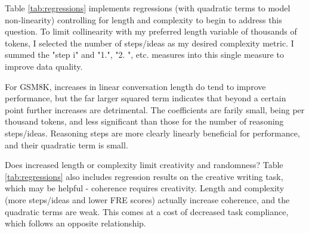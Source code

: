 \documentclass[11pt]{article}
\begin{document}
Table \ref{tab:regressions} implements regressions (with quadratic terms to model non-linearity) controlling for length and complexity to begin to address this question. To limit collinearity with my preferred length variable of thousands of tokens, I selected the number of steps/ideas as my desired complexity metric. I summed the "step i" and "1.", "2. ", etc. measures into this single measure to improve data quality.

For GSM8K, increases in linear conversation length do tend to improve performance, but the far larger squared term indicates that beyond a certain point further increases are detrimental. The coefficients are farily small, being per thousand tokens, and less significant than those for the number of reasoning steps/ideas. Reasoning steps are more clearly linearly beneficial for performance, and their quadratic term is small.

Does increased length or complexity limit creativity and randomness? Table \ref{tab:regressions} also includes regression results on the creative writing task, which may be helpful - coherence requires creativity. Length and complexity (more steps/ideas and lower FRE scores) actually increase coherence, and the quadratic terms are weak. This comes at a cost of decreased task compliance, which follows an opposite relationship.


\end{document}
